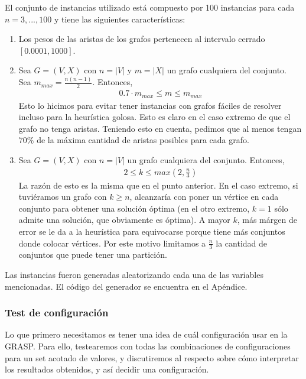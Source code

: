 El conjunto de instancias utilizado está compuesto por 100 instancias para cada \\ ${n = 3, ..., 100}$ y tiene las siguientes características:
\begin{enumerate}
    \item Los pesos de las aristas de los grafos pertenecen al intervalo cerrado $[\num{0.0001}, \num{1000}]$.
    \item Sea $G = (V,X)$ con $n = |V|$ y $m = |X|$ un grafo cualquiera del conjunto.\\ Sea $m_{max} = \frac{n(n-1)}{2}$. Entonces,
            \begin{align*}
                \num{0.7} \cdot m_{max} \leq m \leq m_{max} 
            \end{align*}
            Esto lo hicimos para evitar tener instancias con grafos fáciles de resolver incluso para la heurística golosa. Esto es claro en el caso extremo de que el grafo no tenga aristas. Teniendo esto en cuenta, pedimos que al menos tengan $70\%$ de la máxima cantidad de aristas posibles para cada grafo.
    \item Sea $G = (V,X)$ con $n = |V|$ un grafo cualquiera del conjunto. Entonces,
            \begin{align*}
                        2 \leq k \leq max\left(2, \frac{n}{3}\right)
            \end{align*}
            La razón de esto es la misma que en el punto anterior. En el caso extremo, si tuviéramos un grafo con $k \geq n$, alcanzaría con poner un vértice en cada conjunto para obtener una solución óptima (en el otro extremo, $k = 1$ sólo admite una solución, que obviamente es óptima). A mayor $k$, más márgen de error se le da a la heurística para equivocarse porque tiene más conjuntos donde colocar vértices. Por este motivo limitamos a $\frac{n}{3}$ la cantidad de conjuntos que puede tener una partición.
\end{enumerate}
Las instancias fueron generadas aleatorizando cada una de las variables mencionadas. El código del generador se encuentra en el Apéndice.


\subsubsection{Test de configuración}

Lo que primero necesitamos es tener una idea de cuál configuración usar en la GRASP. Para ello, testearemos con todas las combinaciones de configuraciones para un set acotado de valores, y discutiremos al respecto sobre cómo interpretar los resultados obtenidos, y así decidir una configuración.

